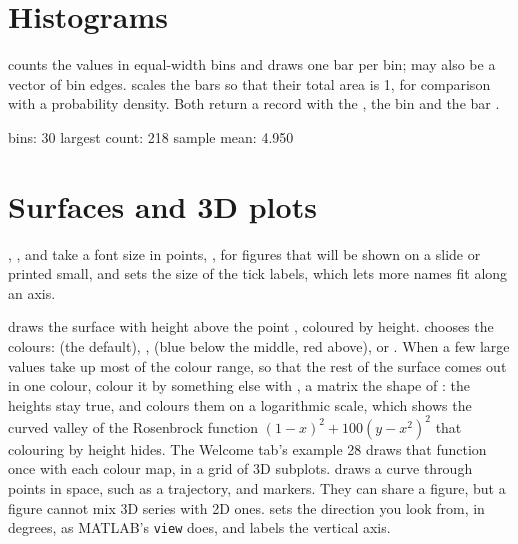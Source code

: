 \documentclass[11pt,a4paper,openany]{report}
\begin{document}
{{

\section{Histograms}

 counts the values in equal-width bins and draws
one bar per bin;  may also be a vector of bin edges.
 scales the bars so that their total area is 1, for
comparison with a probability density. Both return a record with the
, the bin  and the bar .

\begin{axonout}
bins: 30  largest count: 218
sample mean: 4.950
\end{axonout}

\section{Surfaces and 3D plots}

, ,  and 
take a font size in points, , for
figures that will be shown on a slide or printed small, and
 sets the size of the tick labels, which lets more
names fit along an axis.

 draws the surface with height  above
the point , coloured by height.  chooses the
colours:  (the default), , 
(blue below the middle, red above),  or . When a few
large values take up most of the colour range, so that the rest of the
surface comes out in one colour, colour it by something else with
, a matrix the shape of : the heights stay true, and
 colours them on a
logarithmic scale, which shows the curved valley of the Rosenbrock function
$(1 - x)^2 + 100 (y - x^2)^2$ that colouring by height hides. The Welcome
tab's example 28 draws that function once with each colour map, in a grid of
3D subplots.  draws a curve through
points in space, such as a trajectory, and 
markers. They can share a figure, but a figure cannot mix 3D series with 2D
ones.  sets the direction you look from, in
degrees, as MATLAB's \texttt{view} does, and  labels the
vertical axis.

}}
\end{document}
